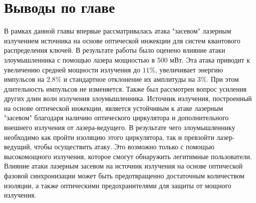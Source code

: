 \section{Выводы по главе}
В рамках данной главы впервые рассматривалась атака "засевом" лазерным излучением источника на основе оптической инжекции для систем квантового распределения ключей. В результате работы было оценено влияние атаки злоумышленника с помощью лазера мощностью в 500 мВт. 
Эта атака приводит к увеличению средней мощности излучения до $11\%$, увеличивает энергию импульсов на $2.8\%$ и стандартное отклонение их амплитуды на 3\%. При этом длительность импульсов не изменяется.
Также был рассмотрен вопрос усиления других длин волн излучения злоумышленника. Источник излучения, построенный на основе оптической инжекции, является устойчивым к атаке лазерным "засевом" благодаря наличию оптического циркулятора и дополнительного внешнего излучения от лазера-ведущего.
В результате чего злоумышленнику необходимо как пройти изоляцию этого циркулятора, так и превзойти лазер-ведущий, чтобы осуществить атаку. Это возможно только с помощью высокомощного излучения, которое смогут обнаружить легитимные пользователи.
\newline Влияние атаки лазерным засевом на источник излучения на основе оптической фазовой синхронизации может быть предотвращенно достаточным количеством изоляции, а также оптическими предохранителями для защиты от мощного излучения.